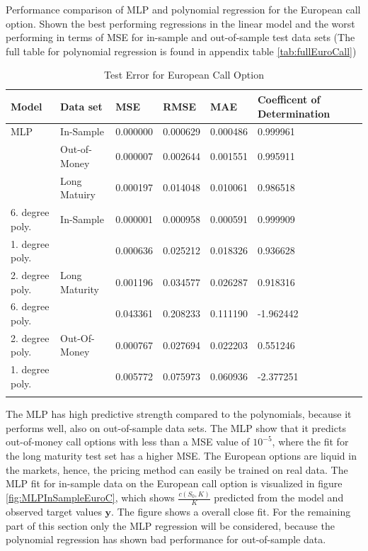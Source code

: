 \begin{table}[H]
\caption{Test Error for European Call Option}{Performance comparison of MLP and polynomial regression for the European call option. Shown the best performing regressions in the linear model and the worst performing in terms of MSE for in-sample and out-of-sample test data sets (The full table for polynomial regression is found in appendix table \ref{tab:fullEuroCall})}
\label{tab:ComparePolyWithMLP}
\centering
\begin{tabular}{l l l l l l l }
\toprule
\textbf{Model} & \textbf{Data set} & \textbf{MSE} & \textbf{RMSE} & \textbf{MAE} & \textbf{Coefficent of Determination} \\
\midrule
MLP & In-Sample & 0.000000 & 0.000629 & 0.000486 & 0.999961\\
& Out-of-Money & 0.000007 & 0.002644 & 0.001551 & 0.995911\\
& Long Matuiry & 0.000197 & 0.014048 & 0.010061 & 0.986518\\
6. degree poly. & In-Sample & 0.000001 & 0.000958 & 0.000591 & 0.999909\\
1. degree poly. &  & 0.000636 & 0.025212 & 0.018326 & 0.936628\\
2. degree poly. & Long Maturity & 0.001196 & 0.034577 & 0.026287 & 0.918316\\
6. degree poly. &  & 0.043361 & 0.208233 & 0.111190 & -1.962442\\
2. degree poly. & Out-Of-Money & 0.000767 & 0.027694 & 0.022203 & 0.551246\\
1. degree poly. &  & 0.005772 & 0.075973 & 0.060936 & -2.377251\\
\bottomrule\\
\end{tabular}
\end{table}

The MLP has high predictive strength compared to the polynomials, because it performs well, also on out-of-sample data sets. The MLP show that it predicts out-of-money call options with less than a MSE value of $10^{-5}$, where the fit for the long maturity test set has a higher MSE. The European options are liquid in the markets, hence, the pricing method can easily be trained on real data. The MLP fit for in-sample data on the European call option is visualized in figure \ref{fig:MLPInSampleEuroC}, which shows $\frac{c(S_0,K)}{K}$ predicted from the model and observed target values $\bm{y}$. The figure shows a overall close fit. For the remaining part of this section only the MLP regression will be considered, because the polynomial regression has shown bad performance for out-of-sample data.

